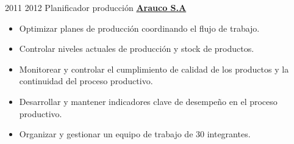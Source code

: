 \documentclass[letterpaper]{DS_class_file} %
\begin{document}
\begin{twenty}
	\twentyitem
	{2011}
	{2012}
	{\hspace{0.3cm}Planificador producción}
	{\href{https://www.arauco.cl/chile/}{\textbf{Arauco S.A}}}
	{}
	{\begin{itemize}
			\item Optimizar planes de producción coordinando el flujo de trabajo.
			\item Controlar niveles actuales de producción y stock de productos.
			\item Monitorear y controlar el cumplimiento de calidad de los productos y la continuidad del proceso productivo. 
			\item Desarrollar y mantener indicadores clave de desempeño en el proceso productivo. 
			\item Organizar y gestionar un equipo de trabajo de 30 integrantes.
	\end{itemize}}
\end{twenty}
\end{document}
